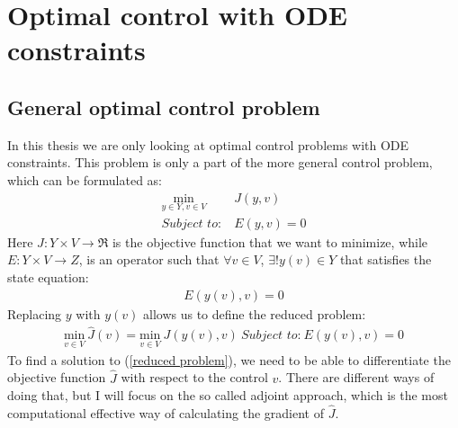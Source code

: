 \chapter{Optimal control with ODE constraints}
\section{General optimal control problem}
In this thesis we are only looking at optimal control problems with ODE constraints. This problem is only a part of the more general control problem, which can be formulated as:
\begin{align}
\underset{y\in Y,v\in V}{\text{min}} \ &J(y,v) \\
\textit{Subject to:} \ &E(y,v)=0
\end{align}
Here $J: Y\times V\rightarrow\Re$ is the objective function that we want to minimize, while $E:Y\times V \rightarrow Z$, is an operator such that $\forall v \in V$, $\exists! y(v)\in Y$ that satisfies the state equation:
\begin{align*}
E(y(v),v)=0
\end{align*}
Replacing $y$ with $y(v)$ allows us to define the reduced problem:
\begin{align}
\underset{v\in V}{\text{min}} \ \hat J(v)=\underset{v\in V}{\text{min}} \ J(y(v),v) \ \textit{Subject to:} \ E(y(v),v)=0 \label{reduced problem}
\end{align}
To find a solution to (\ref{reduced problem}), we need to be able to differentiate the objective function $\hat{J}$ with respect to the control $v$. There are different ways of doing that, but I will focus on the so called adjoint approach, which is the most computational effective way of calculating the gradient of $\hat{J}$.
